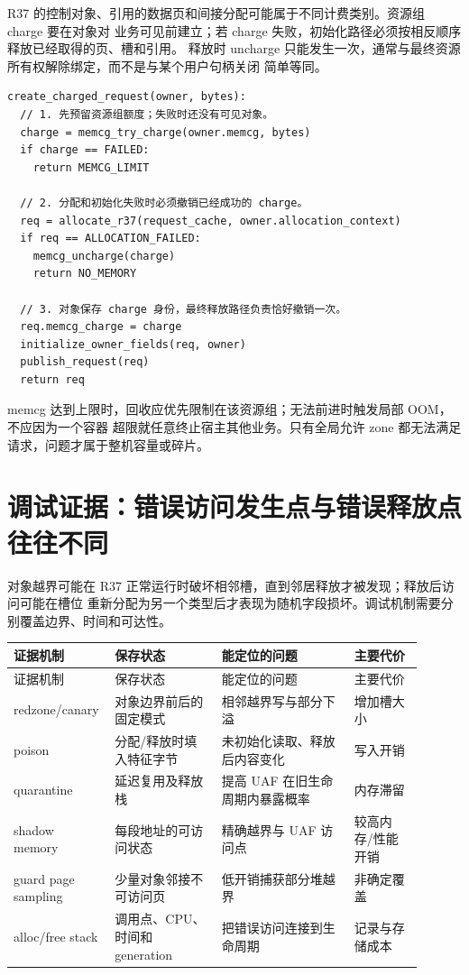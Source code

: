 R37 的控制对象、引用的数据页和间接分配可能属于不同计费类别。资源组 charge 要在对象对
业务可见前建立；若 charge 失败，初始化路径必须按相反顺序释放已经取得的页、槽和引用。
释放时 uncharge 只能发生一次，通常与最终资源所有权解除绑定，而不是与某个用户句柄关闭
简单等同。

\begin{lstlisting}
create_charged_request(owner, bytes):
  // 1. 先预留资源组额度；失败时还没有可见对象。
  charge = memcg_try_charge(owner.memcg, bytes)
  if charge == FAILED:
    return MEMCG_LIMIT

  // 2. 分配和初始化失败时必须撤销已经成功的 charge。
  req = allocate_r37(request_cache, owner.allocation_context)
  if req == ALLOCATION_FAILED:
    memcg_uncharge(charge)
    return NO_MEMORY

  // 3. 对象保存 charge 身份，最终释放路径负责恰好撤销一次。
  req.memcg_charge = charge
  initialize_owner_fields(req, owner)
  publish_request(req)
  return req
\end{lstlisting}

memcg 达到上限时，回收应优先限制在该资源组；无法前进时触发局部 OOM，不应因为一个容器
超限就任意终止宿主其他业务。只有全局允许 zone 都无法满足请求，问题才属于整机容量或碎片。

\section{调试证据：错误访问发生点与错误释放点往往不同}

对象越界可能在 R37 正常运行时破坏相邻槽，直到邻居释放才被发现；释放后访问可能在槽位
重新分配为另一个类型后才表现为随机字段损坏。调试机制需要分别覆盖边界、时间和可达性。

\begin{longtable}{|L{0.18\linewidth}|L{0.25\linewidth}|L{0.31\linewidth}|L{0.16\linewidth}|}
\hline
证据机制 & 保存状态 & 能定位的问题 & 主要代价 \\ \hline
\endfirsthead
\hline
证据机制 & 保存状态 & 能定位的问题 & 主要代价 \\ \hline
\endhead
redzone/\allowbreak canary & 对象边界前后的固定模式 & 相邻越界写与部分下溢 & 增加槽大小 \\\tablerowrule
poison & 分配/释放时填入特征字节 & 未初始化读取、释放后内容变化 & 写入开销 \\\tablerowrule
quarantine & 延迟复用及释放栈 & 提高 UAF 在旧生命周期内暴露概率 & 内存滞留 \\\tablerowrule
shadow memory & 每段地址的可访问状态 & 精确越界与 UAF 访问点 & 较高内存/性能开销 \\\tablerowrule
guard page sampling & 少量对象邻接不可访问页 & 低开销捕获部分堆越界 & 非确定覆盖 \\\tablerowrule
alloc/free stack & 调用点、CPU、时间和 generation & 把错误访问连接到生命周期 & 记录与存储成本 \\
\hline
\end{longtable}

